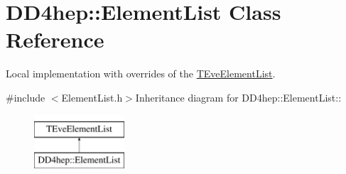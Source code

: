 \hypertarget{class_d_d4hep_1_1_element_list}{
\section{DD4hep::ElementList Class Reference}
\label{class_d_d4hep_1_1_element_list}
}


Local implementation with overrides of the \hyperlink{class_t_eve_element_list}{TEveElementList}.  


{\ttfamily \#include $<$ElementList.h$>$}Inheritance diagram for DD4hep::ElementList::\begin{figure}[H]
\begin{center}
\leavevmode
\includegraphics[height=2cm]{class_d_d4hep_1_1_element_list}
\end{center}
\end{figure}
